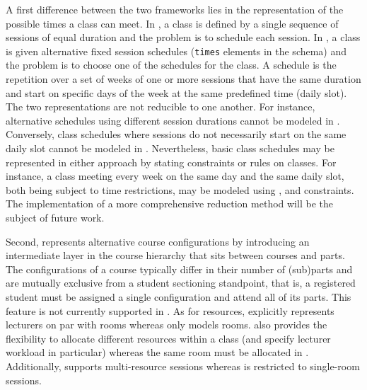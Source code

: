 A first difference between the two frameworks lies in the representation of the possible times a class can meet.
In {\UTP}, a class is defined by a single sequence of sessions of equal duration and the problem is to schedule each session.
In {\ITC}, a class is given alternative fixed session schedules ({\texttt{times}} elements in the {\XML} schema) and the problem is to choose one of the schedules for the class.
A schedule is the repetition over a set of weeks of one or more sessions that have the same duration and start on specific days of the week at the same predefined time (daily slot).
The two representations are not reducible to one another.
For instance, alternative schedules using different session durations cannot be modeled in {\UTP}.
Conversely, class schedules where sessions do not necessarily start on the same daily slot cannot be modeled in {\ITC}.
Nevertheless, basic class schedules may be represented in either approach by stating {\ITC} constraints or {\UTP} rules on classes.
For instance, a class meeting every week on the same day and the same daily slot, both being subject to time restrictions, may be modeled using \texttt{\SAMEDAILYSLOT}, \texttt{\WEEKLY} and \texttt{\FORBIDDENPERIOD} constraints.
The implementation of a more comprehensive reduction method %
will be the subject of future work.

Second, 
{\ITC} represents alternative course configurations
by introducing an intermediate layer in the course hierarchy 
that sits between courses and parts.
The configurations of a course typically differ in their number of (sub)parts
and are mutually exclusive from a student sectioning standpoint, that is, 
a registered student must be assigned a single configuration and attend all of its parts.
This feature is not currently supported in {\UTP}.
As for resources, {\UTP} explicitly represents lecturers on par with rooms %
whereas {\ITC} only models rooms.
{\UTP} also provides the flexibility to allocate different resources within a class 
(and specify lecturer workload in particular) %
whereas the same room must be allocated in {\ITC}.
Additionally, {\UTP} supports multi-resource sessions whereas {\ITC} is restricted to single-room sessions.

